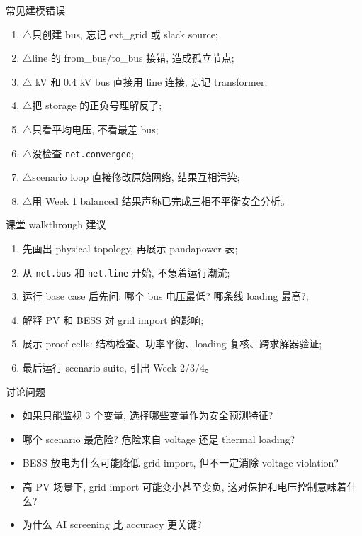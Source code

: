 \documentclass[aspectratio=169,10pt]{ctexbeamer}
\newcommand{\code}[1]{\texttt{#1}}
\newcommand{\warnitem}{\textcolor{warnorange}{\Large$\triangle$}\;}
\begin{document}
\begin{frame}{常见建模错误}
\begin{enumerate}
  \item \warnitem 只创建 bus, 忘记 ext\_grid 或 slack source;
  \item \warnitem line 的 from\_bus/to\_bus 接错, 造成孤立节点;
  \item \warnitem 20 kV 和 0.4 kV bus 直接用 line 连接, 忘记 transformer;
  \item \warnitem 把 storage 的正负号理解反了;
  \item \warnitem 只看平均电压, 不看最差 bus;
  \item \warnitem 没检查 \code{net.converged};
  \item \warnitem scenario loop 直接修改原始网络, 结果互相污染;
  \item \warnitem 用 Week 1 balanced 结果声称已完成三相不平衡安全分析。
\end{enumerate}
\end{frame}

\begin{frame}{课堂 walkthrough 建议}
\begin{enumerate}
  \item 先画出 physical topology, 再展示 pandapower 表;
  \item 从 \code{net.bus} 和 \code{net.line} 开始, 不急着运行潮流;
  \item 运行 base case 后先问: 哪个 bus 电压最低? 哪条线 loading 最高?;
  \item 解释 PV 和 BESS 对 grid import 的影响;
  \item 展示 proof cells: 结构检查、功率平衡、loading 复核、跨求解器验证;
  \item 最后运行 scenario suite, 引出 Week 2/3/4。
\end{enumerate}
\end{frame}

\begin{frame}{讨论问题}
\begin{itemize}
  \item 如果只能监视 3 个变量, 选择哪些变量作为安全预测特征?
  \item 哪个 scenario 最危险? 危险来自 voltage 还是 thermal loading?
  \item BESS 放电为什么可能降低 grid import, 但不一定消除 voltage violation?
  \item 高 PV 场景下, grid import 可能变小甚至变负, 这对保护和电压控制意味着什么?
  \item 为什么 AI screening 比 accuracy 更关键?
\end{itemize}
\end{frame}
\end{document}
